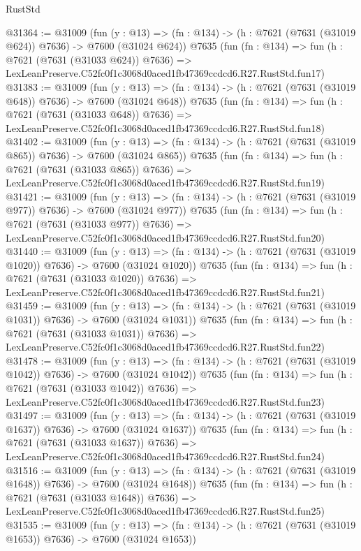\begin{lexlean}{RustStd}
\begin{coremodule}
@31364 := @31009
    (fun (y : @13) => (fn : @134) -> (h : @7621 (@7631 (@31019 @624)) @7636) -> @7600 (@31024 @624))
    @7635
    (fun (fn : @134) =>
    fun (h : @7621 (@7631 (@31033 @624)) @7636) =>
    LexLeanPreserve.C52fc0f1c3068d0aced1fb47369ccdcd6.R27.RustStd.fun17)
@31383 := @31009
    (fun (y : @13) => (fn : @134) -> (h : @7621 (@7631 (@31019 @648)) @7636) -> @7600 (@31024 @648))
    @7635
    (fun (fn : @134) =>
    fun (h : @7621 (@7631 (@31033 @648)) @7636) =>
    LexLeanPreserve.C52fc0f1c3068d0aced1fb47369ccdcd6.R27.RustStd.fun18)
@31402 := @31009
    (fun (y : @13) => (fn : @134) -> (h : @7621 (@7631 (@31019 @865)) @7636) -> @7600 (@31024 @865))
    @7635
    (fun (fn : @134) =>
    fun (h : @7621 (@7631 (@31033 @865)) @7636) =>
    LexLeanPreserve.C52fc0f1c3068d0aced1fb47369ccdcd6.R27.RustStd.fun19)
@31421 := @31009
    (fun (y : @13) => (fn : @134) -> (h : @7621 (@7631 (@31019 @977)) @7636) -> @7600 (@31024 @977))
    @7635
    (fun (fn : @134) =>
    fun (h : @7621 (@7631 (@31033 @977)) @7636) =>
    LexLeanPreserve.C52fc0f1c3068d0aced1fb47369ccdcd6.R27.RustStd.fun20)
@31440 := @31009
    (fun (y : @13) =>
    (fn : @134) -> (h : @7621 (@7631 (@31019 @1020)) @7636) -> @7600 (@31024 @1020))
    @7635
    (fun (fn : @134) =>
    fun (h : @7621 (@7631 (@31033 @1020)) @7636) =>
    LexLeanPreserve.C52fc0f1c3068d0aced1fb47369ccdcd6.R27.RustStd.fun21)
@31459 := @31009
    (fun (y : @13) =>
    (fn : @134) -> (h : @7621 (@7631 (@31019 @1031)) @7636) -> @7600 (@31024 @1031))
    @7635
    (fun (fn : @134) =>
    fun (h : @7621 (@7631 (@31033 @1031)) @7636) =>
    LexLeanPreserve.C52fc0f1c3068d0aced1fb47369ccdcd6.R27.RustStd.fun22)
@31478 := @31009
    (fun (y : @13) =>
    (fn : @134) -> (h : @7621 (@7631 (@31019 @1042)) @7636) -> @7600 (@31024 @1042))
    @7635
    (fun (fn : @134) =>
    fun (h : @7621 (@7631 (@31033 @1042)) @7636) =>
    LexLeanPreserve.C52fc0f1c3068d0aced1fb47369ccdcd6.R27.RustStd.fun23)
@31497 := @31009
    (fun (y : @13) =>
    (fn : @134) -> (h : @7621 (@7631 (@31019 @1637)) @7636) -> @7600 (@31024 @1637))
    @7635
    (fun (fn : @134) =>
    fun (h : @7621 (@7631 (@31033 @1637)) @7636) =>
    LexLeanPreserve.C52fc0f1c3068d0aced1fb47369ccdcd6.R27.RustStd.fun24)
@31516 := @31009
    (fun (y : @13) =>
    (fn : @134) -> (h : @7621 (@7631 (@31019 @1648)) @7636) -> @7600 (@31024 @1648))
    @7635
    (fun (fn : @134) =>
    fun (h : @7621 (@7631 (@31033 @1648)) @7636) =>
    LexLeanPreserve.C52fc0f1c3068d0aced1fb47369ccdcd6.R27.RustStd.fun25)
@31535 := @31009
    (fun (y : @13) =>
    (fn : @134) -> (h : @7621 (@7631 (@31019 @1653)) @7636) -> @7600 (@31024 @1653))

\end{coremodule}
\end{lexlean}
